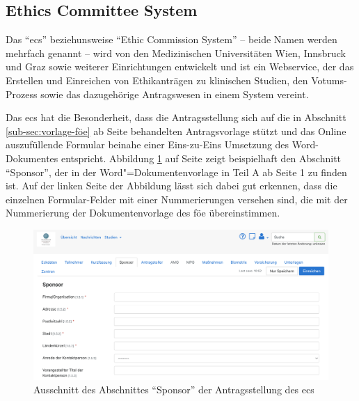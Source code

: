 \documentclass[a4paper,12pt,twoside]{scrreprt}
\begin{document}
\subsection{Ethics Committee System}
\label{sub-sec:ecs}

Das \enquote{\ac{ecs}} beziehunsweise \enquote{Ethic Commission System} -- beide Namen werden mehrfach genannt -- wird von den Medizinischen Universitäten Wien, Innsbruck und Graz sowie weiterer Einrichtungen entwickelt und ist ein Webservice, der das Erstellen und Einreichen von Ethikanträgen zu klinischen Studien, den Votums-Prozess sowie das dazugehörige Antragswesen in einem System vereint. \cite{medizinische_universitat_wien_ecs-docs_about-2021}

\medskip

Das \ac{ecs} hat die Besonderheit, dass die Antragsstellung sich auf die in Abschnitt \ref{sub-sec:vorlage-föe} ab Seite \pageref{sub-sec:vorlage-föe} behandelten Antragsvorlage stützt und das Online auszufüllende Formular beinahe einer Eins-zu-Eins Umsetzung des Word-Dokumentes entspricht. Abbildung \ref{fig:abschnitt-sponsor-ecs} auf Seite \pageref{fig:abschnitt-sponsor-ecs} zeigt beispielhaft den Abschnitt \enquote{Sponsor}, der in der Word"=Dokumentenvorlage in Teil A ab Seite 1 zu finden ist. Auf der linken Seite der Abbildung lässt sich dabei gut erkennen, dass die einzelnen Formular-Felder mit einer Nummerierungen versehen sind, die mit der Nummerierung der Dokumentenvorlage des \ac{föe} übereinstimmen.

\begin{figure}[ht]
    \centering
    \includegraphics[width=\linewidth]{thesis/images/Luidold_ECS-Schritt-Eckdaten.png}
    \caption[Ausschnitt des Abschnittes \enquote{Sponsor} der Antragsstellung des \acl{ecs}]{Ausschnitt des Abschnittes \enquote{Sponsor} der Antragsstellung des \acl{ecs} \cite{ethikkommission_der_medizinischen_universitat_innsbruck_ethikkommission_2023}}
    \label{fig:abschnitt-sponsor-ecs}
\end{figure}
\end{document}
